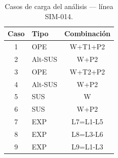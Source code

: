 \begin{table}[htbp]
  \centering
  \small
  \caption{Casos de carga del análisis — línea SIM-014.}
  \label{tab:casos}
  \begin{tabular}{clc}
    \toprule
    Caso & Tipo & Combinaci\'on \\
    \midrule
    1 & OPE & W+T1+P2 \\
    2 & Alt-SUS & W+P2 \\
    3 & OPE & W+T2+P2 \\
    4 & Alt-SUS & W+P2 \\
    5 & SUS & W \\
    6 & SUS & W+P2 \\
    7 & EXP & L7=L1-L5 \\
    8 & EXP & L8=L3-L6 \\
    9 & EXP & L9=L1-L3 \\
    \bottomrule
  \end{tabular}
\end{table}
